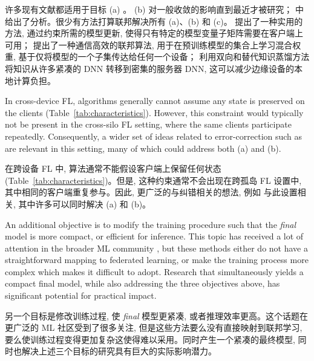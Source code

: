 许多现有文献都适用于目标 (a) \citep{konevcny2016federated,suresh2017distributed, konevcny2018randomized, alistarh2017qsgd, horvath2019natural, basu2020qsparse}。 (b) 对一般收敛的影响直到最近才被研究； \citep{chraibi2019distributed} 中给出了分析。很少有方法打算联邦解决所有 (a)、(b) 和 (c)。 \citet{caldas2018expanding} 提出了一种实用的方法, 通过约束所需的模型更新, 使得只有特定的模型变量子矩阵需要在客户端上可用； \citet{hamer2020fedboost} 提出了一种通信高效的联邦算法, 用于在预训练模型的集合上学习混合权重, 基于仅将模型的一个子集传达给任何一个设备； \citet{FedGKT2020} 利用双向和替代知识蒸馏方法将知识从许多紧凑的 DNN 转移到密集的服务器 DNN, 这可以减少边缘设备的本地计算负担。


In cross-device FL, algorithms generally cannot assume any state is preserved on the clients (Table~\ref{tab:characteristics}). However, this constraint would typically not be present in the cross-silo FL setting, where the same clients participate repeatedly. Consequently, a wider set of ideas related to error-correction such as \citep{lin2017deep, sattler2019robust, vogels2019powersgd, tang2019texttt, karimireddy2019ef, stich2019error} are relevant in this setting, many of which could address both (a) and (b).

在跨设备 FL 中, 算法通常不能假设客户端上保留任何状态(Table~\ref{tab:characteristics})。但是, 这种约束通常不会出现在跨孤岛 FL 设置中, 其中相同的客户端重复参与。因此, 更广泛的与纠错相关的想法, 例如 \citep{lin2017deep, sattler2019robust, vogels2019powersgd, tang2019texttt, karimireddy2019ef, stich2019error} 与此设置相关, 其中许多可以同时解决 (a) 和 (b)。

An additional objective is to modify the training procedure such that the \emph{final} model is more compact, or efficient for inference. This topic has received a lot of attention in the broader ML community \citep{han2015deep, courbariaux2015binaryconnect, zhu2017prune, lin2016fixed, oktay2019model, blalock2020state}, but these methods either do not have a straightforward mapping to federated learning, or make the training process more complex which makes it difficult to adopt. Research that simultaneously yields a compact final model, while also addressing the three objectives above, has significant potential for practical impact.

另一个目标是修改训练过程, 使 \emph{final} 模型更紧凑, 或者推理效率更高。这个话题在更广泛的 ML 社区受到了很多关注\citep{han2015deep, courbariaux2015binaryconnect, zhu2017prune, lin2016fixed, oktay2019model, blalock2020state}, 但是这些方法要么没有直接映射到联邦学习, 要么使训练过程变得更加复杂这使得难以采用。同时产生一个紧凑的最终模型, 同时也解决上述三个目标的研究具有巨大的实际影响潜力。


